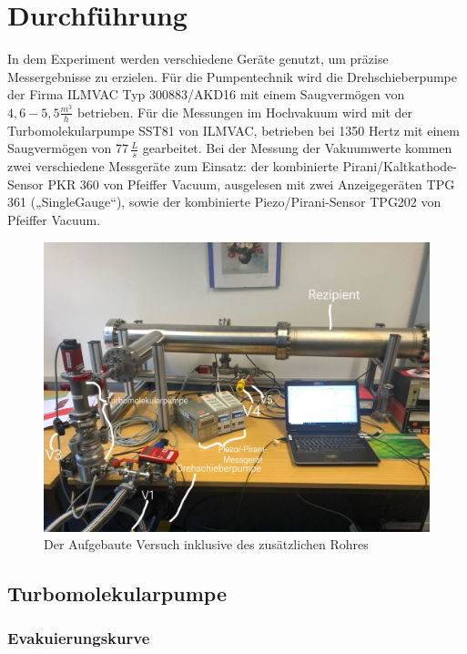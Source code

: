 \section{Durchführung}
\label{sec:Durchführung}

In dem Experiment werden verschiedene Geräte genutzt, um präzise Messergebnisse zu erzielen.
Für die Pumpentechnik wird die Drehschieberpumpe der Firma ILMVAC Typ 300883/AKD16 mit einem Saugvermögen von \(4,6-5,5 \frac{m^3}{h}\)
betrieben. Für die Messungen im Hochvakuum wird mit der Turbomolekularpumpe SST81 von ILMVAC, betrieben bei 1350 Hertz mit
einem Saugvermögen von \(77 \, \frac{L}{s}\) gearbeitet. Bei der Messung der Vakuumwerte kommen zwei verschiedene Messgeräte zum Einsatz:
der kombinierte Pirani/Kaltkathode-Sensor PKR 360 von Pfeiffer Vacuum, ausgelesen mit zwei Anzeigegeräten TPG 361 („SingleGauge“),
sowie der kombinierte Piezo/Pirani-Sensor TPG202 von Pfeiffer Vacuum.
\cite{delta_tu_dortmund}


\begin{figure}
    \includegraphics[width=\textwidth]{bilder/Aufbau.jpeg}
    \caption{Der Aufgebaute Versuch inklusive des zusätzlichen Rohres}
\end{figure}


\subsection{Turbomolekularpumpe}
\subsubsection{Evakuierungskurve}


